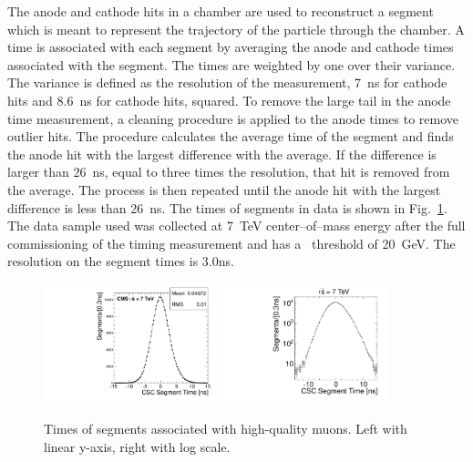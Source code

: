 The anode and cathode hits in a chamber are used to reconstruct a segment which is meant to represent the trajectory of the particle through the chamber. A time is
associated with each segment by averaging the anode and cathode times associated with the segment. The times are weighted by one over their variance.
The variance is defined as the resolution of the measurement, 7~ns for cathode hits and 8.6~ns for cathode hits, squared.
To remove the large tail in the anode time measurement,
a cleaning procedure is applied to the anode times to remove outlier hits. The procedure calculates the average time of the segment and finds the anode hit with the largest
difference with the average. If the difference is larger than 26~ns, equal to three times the resolution,
that hit is removed from the average. The process is then repeated until the
anode hit with the largest difference is less than 26~ns.
The times of segments in data is shown in Fig.~\ref{fig:SegTimes}. 
The data sample used was collected at 7~TeV center--of--mass energy after the full commissioning of the timing measurement and has a \pt\ threshold of 20~GeV.
The resolution on the segment times is 3.0ns.

\begin{figure}
  \begin{center}
      \includegraphics[width=0.44\textwidth]{figures/timing/StripAndWireSegmentTime}
      \includegraphics[width=0.44\textwidth]{figures/timing/StripAndWireSegmentTimeLog}
      \caption[Distribution of times of segments]
      {Times of segments associated with high-quality muons. Left with linear y-axis, right with log scale.
        }
      \label{fig:SegTimes}
  \end{center}
\end{figure}

